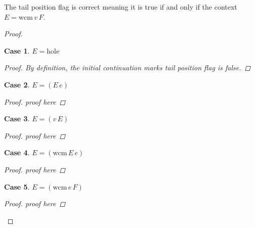 \documentclass[ms,electronic,twosidetoc,letterpaper,chaptercenter,parttop]{byumsphd}
\begin{document}

\newtheorem{case_tpf}{Case}
\begin{thm}
The tail position flag is correct meaning it is true if and only if the context $E=\mathrm{wcm}\,v\,F$.
\end{thm}
\begin{proof}
\begin{case_tpf}
$E=\mathrm{hole}$ %
\begin{proof}
By definition, the initial continuation marks tail position flag is false.
\end{proof}
\end{case_tpf}
\begin{case_tpf}
$E=(E\,e)$
\begin{proof}
proof here
\end{proof}
\end{case_tpf}
\begin{case_tpf}
$E=(v\,E)$
\begin{proof}
proof here
\end{proof}
\end{case_tpf}
\begin{case_tpf}
$E=(\mathrm{wcm}\,E\,e)$
\begin{proof}
proof here
\end{proof}
\end{case_tpf}
\begin{case_tpf}
$E=(\mathrm{wcm}\,e\,F)$
\begin{proof}
proof here
\end{proof}
\end{case_tpf}
\end{proof}

\end{document}
